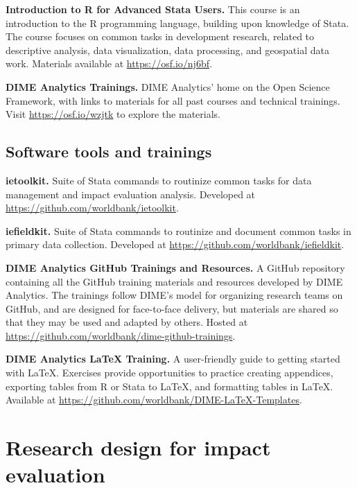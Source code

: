 \documentclass[
]{book}
\begin{document}
\textbf{Introduction to R for Advanced Stata Users.}
This course is an introduction to the R programming language,
building upon knowledge of Stata. The course focuses on common tasks in development research,
related to descriptive analysis, data visualization, data processing, and geospatial data work.
Materials available at \url{https://osf.io/nj6bf}.

\textbf{DIME Analytics Trainings.}
DIME Analytics' home on the Open Science Framework,
with links to materials for all past courses and technical trainings.
Visit \url{https://osf.io/wzjtk} to explore the materials.

\hypertarget{software-tools-and-trainings}{%
\section*{Software tools and trainings}\label{software-tools-and-trainings}}

\textbf{ietoolkit.} Suite of Stata commands to routinize common tasks for data management and impact evaluation analysis.
Developed at \url{https://github.com/worldbank/ietoolkit}.

\textbf{iefieldkit.} Suite of Stata commands to routinize and document common tasks in primary data collection.
Developed at \url{https://github.com/worldbank/iefieldkit}.

\textbf{DIME Analytics GitHub Trainings and Resources.} A GitHub repository containing all the GitHub training materials and
resources developed by DIME Analytics.
The trainings follow DIME's model for organizing research teams on GitHub,
and are designed for face-to-face delivery,
but materials are shared so that they may be used and adapted by others.
Hosted at \url{https://github.com/worldbank/dime-github-trainings}.

\textbf{DIME Analytics LaTeX Training.} A user-friendly guide to getting started with LaTeX.
Exercises provide opportunities to practice creating appendices,
exporting tables from R or Stata to LaTeX,
and formatting tables in LaTeX.
Available at \url{https://github.com/worldbank/DIME-LaTeX-Templates}.

\hypertarget{design}{%
\chapter{Research design for impact evaluation}\label{design}}
\end{document}
